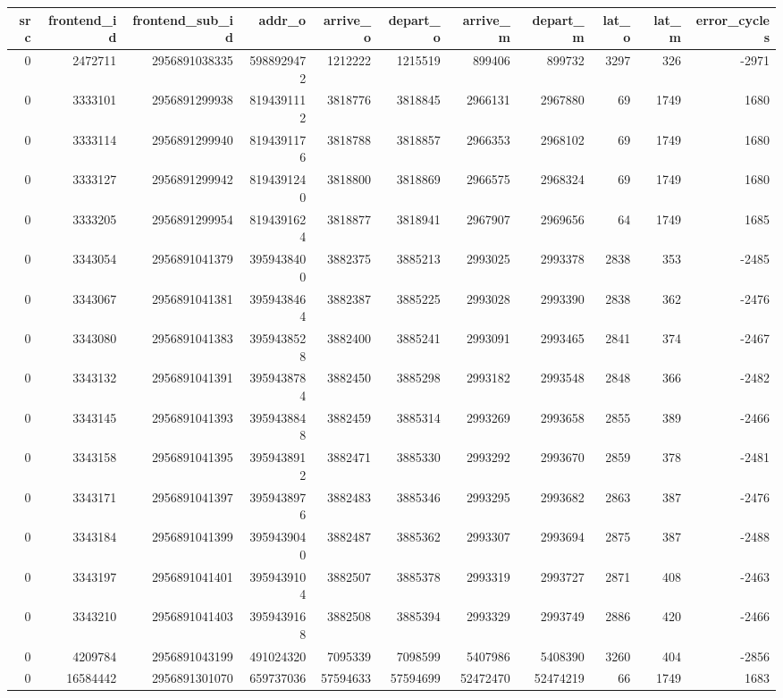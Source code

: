 \begin{tabular}{rrrrrrrrrrr}
\toprule
src & frontend\_id & frontend\_sub\_id & addr\_o & arrive\_o & depart\_o & arrive\_m & depart\_m & lat\_o & lat\_m & error\_cycles \\
\midrule
0 & 2472711 & 2956891038335 & 5988929472 & 1212222 & 1215519 & 899406 & 899732 & 3297 & 326 & -2971 \\
0 & 3333101 & 2956891299938 & 8194391112 & 3818776 & 3818845 & 2966131 & 2967880 & 69 & 1749 & 1680 \\
0 & 3333114 & 2956891299940 & 8194391176 & 3818788 & 3818857 & 2966353 & 2968102 & 69 & 1749 & 1680 \\
0 & 3333127 & 2956891299942 & 8194391240 & 3818800 & 3818869 & 2966575 & 2968324 & 69 & 1749 & 1680 \\
0 & 3333205 & 2956891299954 & 8194391624 & 3818877 & 3818941 & 2967907 & 2969656 & 64 & 1749 & 1685 \\
0 & 3343054 & 2956891041379 & 3959438400 & 3882375 & 3885213 & 2993025 & 2993378 & 2838 & 353 & -2485 \\
0 & 3343067 & 2956891041381 & 3959438464 & 3882387 & 3885225 & 2993028 & 2993390 & 2838 & 362 & -2476 \\
0 & 3343080 & 2956891041383 & 3959438528 & 3882400 & 3885241 & 2993091 & 2993465 & 2841 & 374 & -2467 \\
0 & 3343132 & 2956891041391 & 3959438784 & 3882450 & 3885298 & 2993182 & 2993548 & 2848 & 366 & -2482 \\
0 & 3343145 & 2956891041393 & 3959438848 & 3882459 & 3885314 & 2993269 & 2993658 & 2855 & 389 & -2466 \\
0 & 3343158 & 2956891041395 & 3959438912 & 3882471 & 3885330 & 2993292 & 2993670 & 2859 & 378 & -2481 \\
0 & 3343171 & 2956891041397 & 3959438976 & 3882483 & 3885346 & 2993295 & 2993682 & 2863 & 387 & -2476 \\
0 & 3343184 & 2956891041399 & 3959439040 & 3882487 & 3885362 & 2993307 & 2993694 & 2875 & 387 & -2488 \\
0 & 3343197 & 2956891041401 & 3959439104 & 3882507 & 3885378 & 2993319 & 2993727 & 2871 & 408 & -2463 \\
0 & 3343210 & 2956891041403 & 3959439168 & 3882508 & 3885394 & 2993329 & 2993749 & 2886 & 420 & -2466 \\
0 & 4209784 & 2956891043199 & 491024320 & 7095339 & 7098599 & 5407986 & 5408390 & 3260 & 404 & -2856 \\
0 & 16584442 & 2956891301070 & 659737036 & 57594633 & 57594699 & 52472470 & 52474219 & 66 & 1749 & 1683 \\

\end{tabular}
